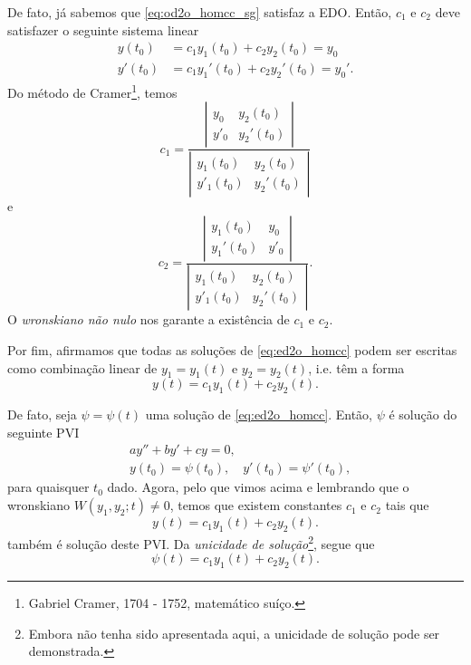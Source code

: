 De fato, já sabemos que \eqref{eq:od2o_homcc_sg} satisfaz a EDO. Então, $c_1$ e $c_2$ deve satisfazer o seguinte sistema linear
\begin{align}
  y(t_0) &= c_1y_1(t_0) + c_2y_2(t_0) = y_0\\
  y'(t_0) &= c_1y_1'(t_0) + c_2y_2'(t_0) = y_0'.
\end{align}
Do método de Cramer\footnote{Gabriel Cramer, 1704 - 1752, matemático suíço.}, temos
\begin{equation}
  c_1 = \frac{\left|
      \begin{matrix}
        y_0 & y_2(t_0) \\
        y'_0 & y_2'(t_0)
      \end{matrix}
\right|}{\left|
      \begin{matrix}
        y_1(t_0) & y_2(t_0) \\
        y'_1(t_0) & y_2'(t_0)
      \end{matrix}
\right|}
\end{equation}
e
\begin{equation}
  c_2 = \frac{\left|
      \begin{matrix}
        y_1(t_0) & y_0\\
        y_1'(t_0) & y'_0
      \end{matrix}
\right|}{\left|
      \begin{matrix}
        y_1(t_0) & y_2(t_0) \\
        y'_1(t_0) & y_2'(t_0)
      \end{matrix}
\right|}.
\end{equation}
O \emph{wronskiano não nulo} nos garante a existência de $c_1$ e $c_2$.

Por fim, afirmamos que todas as soluções de \eqref{eq:ed2o_homcc} podem ser escritas como combinação linear de $y_1 = y_1(t)$ e $y_2 = y_2(t)$, i.e. têm a forma
\begin{equation}
  y(t) = c_1y_1(t) + c_2y_2(t).
\end{equation}

De fato, seja $\psi = \psi(t)$ uma solução de \eqref{eq:ed2o_homcc}. Então, $\psi$ é solução do seguinte PVI
\begin{align}
  &ay'' + by' + cy = 0,\\
  &y(t_0) = \psi(t_0),\quad y'(t_0) = \psi'(t_0),
\end{align}
para quaisquer $t_0$ dado. Agora, pelo que vimos acima e lembrando que o wronskiano $W(y_1,y_2;t)\neq 0$, temos que existem constantes $c_1$ e $c_2$ tais que
\begin{equation}
  y(t) = c_1y_1(t) + c_2y_2(t).
\end{equation}
também é solução deste PVI. Da \emph{unicidade de solução}\footnote{Embora não tenha sido apresentada aqui, a unicidade de solução pode ser demonstrada.}, segue que
\begin{equation}
  \psi(t) = c_1y_1(t) + c_2y_2(t).
\end{equation}

